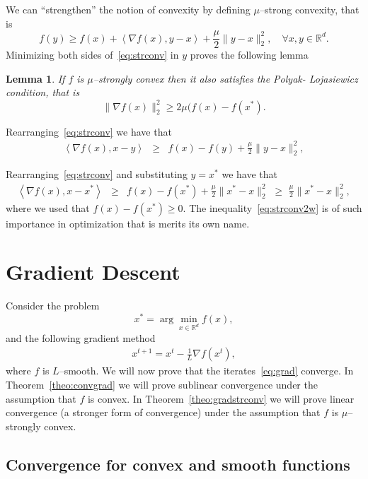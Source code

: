 \documentclass[11pt]{article}
\newcommand{\R}{\mathbb{R}}
\newcommand{\norm}[1]{\lVert#1\rVert}
\newcommand{\dotprod}[1]{\left< #1\right>}
\newtheorem{lemma}{Lemma}[section]
\begin{document}
We can ``strengthen'' the notion of convexity  by defining $\mu$--strong convexity, that is
\begin{equation} \label{eq:strconv}
 f(y) \geq f(x) + \dotprod{\nabla f(x), y-x} + \frac{\mu}{2} \norm{y-x}_2^2, \quad \forall x,y \in \R^d.
\end{equation}
 Minimizing both sides of~\eqref{eq:strconv} in $y$ proves the following lemma
\begin{lemma} If $f$ is $\mu$--strongly convex then it also satisfies the \emph{Polyak- Lojasiewicz} condition, that is 
\begin{equation}
\norm{\nabla f(x)}_2^2 \geq 2 \mu (f(x) -f(x^*). \label{eq:gradnormlow}
\end{equation}
\end{lemma}
Rearranging~\eqref{eq:strconv} we have that
\begin{eqnarray}
\dotprod{\nabla f(x), x- y}  &\geq & f(x) -f(y) +\frac{\mu}{2} \norm{y - x}_2^2, \label{eq:strconv2}\end{eqnarray}

Rearranging~\eqref{eq:strconv} and substituting $y= x^*$ we have that
\begin{eqnarray}
\dotprod{\nabla f(x), x- x^*}  &\geq & f(x) -f(x^*) +\frac{\mu}{2} \norm{x^* - x}_2^2 
\,\,\geq\,\, \frac{\mu}{2} \norm{x^* - x}_2^2, \label{eq:strconv2w}\end{eqnarray}
where we used that $f(x)-f(x^*) \geq 0.$ The inequality~\eqref{eq:strconv2w} is of such importance in optimization that is merits its own name.



\section{Gradient Descent}
Consider the problem 
\begin{equation}
x^* = \arg\min_{x \in \R^d} f(x),
\end{equation}
and  the following gradient method
\begin{eqnarray}
x^{t+1} = x^t - \frac{1}{L}\nabla f(x^t), \label{eq:grad}
\end{eqnarray}
where $f$ is $L$--smooth.
We will now prove that the iterates~\eqref{eq:grad} converge. In Theorem~\ref{theo:convgrad} we will prove sublinear convergence under the assumption that $f$ is convex. In Theorem~\ref{theo:gradstrconv} we will prove linear convergence (a stronger form of convergence) under the assumption that $f$ is $\mu$--strongly convex.
\subsection{Convergence for convex and smooth functions}
\end{document}
